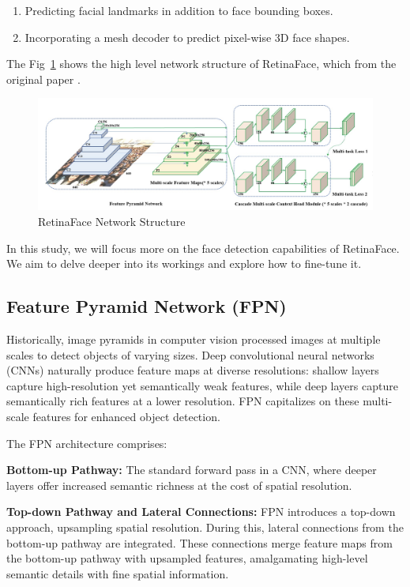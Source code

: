 \documentclass{article}
\begin{document}
\begin{enumerate}
\item Predicting facial landmarks in addition to face bounding boxes.
\item Incorporating a mesh decoder to predict pixel-wise 3D face shapes.
\end{enumerate}

The Fig~\ref{fig:structure} shows the high level network structure of RetinaFace, which from the original paper \cite{deng2020retinaface}.

\begin{figure}[h]
  \centering
  \includegraphics[width=0.7\linewidth]{images/network_structure}
  \caption{RetinaFace Network Structure}
  \label{fig:structure}
\end{figure}

In this study, we will focus more on the face detection capabilities of RetinaFace. We aim to delve deeper into its workings and explore how to fine-tune it.

\subsection{Feature Pyramid Network (FPN)}

Historically, image pyramids in computer vision processed images at multiple scales to detect objects of varying sizes. Deep convolutional neural networks (CNNs) naturally produce feature maps at diverse resolutions: shallow layers capture high-resolution yet semantically weak features, while deep layers capture semantically rich features at a lower resolution. FPN \cite{lin2017feature} capitalizes on these multi-scale features for enhanced object detection.

The FPN architecture comprises:

\textbf{Bottom-up Pathway:} The standard forward pass in a CNN, where deeper layers offer increased semantic richness at the cost of spatial resolution.

\textbf{Top-down Pathway and Lateral Connections:} FPN introduces a top-down approach, upsampling spatial resolution. During this, lateral connections from the bottom-up pathway are integrated. These connections merge feature maps from the bottom-up pathway with upsampled features, amalgamating high-level semantic details with fine spatial information.
\end{document}
